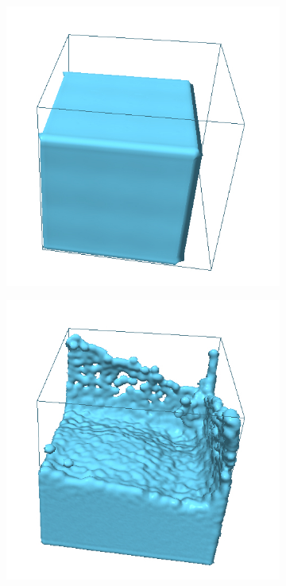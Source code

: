 \begin{figure}[h!]
    \captionsetup{justification=centering}
	\centering
	\begin{subfigure}[t]{.3\textwidth}
			\centering
        	\includegraphics[scale=0.8]{obrazky-figures/app/Simple01.jpg}
	\end{subfigure}%
	\begin{subfigure}[t]{.3\textwidth}
		\centering
		\includegraphics[scale=0.8]{obrazky-figures/app/Simple02.jpg}

\end{subfigure}
\end{figure}
